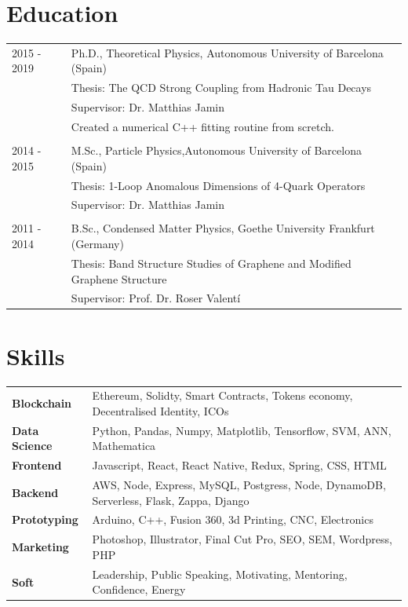 \documentclass[11pt]{article}
\begin{document}
\section*{Education}
\begin{tabularx}{\textwidth}{sX}
  2015 - 2019  & Ph.D., Theoretical Physics, Autonomous University of
                 Barcelona (Spain) \\
               & Thesis: The QCD Strong Coupling from Hadronic Tau
                 Decays \\
               & Supervisor: Dr. Matthias Jamin \\
               & Created a numerical C++ fitting routine from scretch. \\\\
  2014 - 2015  & M.Sc., Particle Physics,Autonomous University of
                                Barcelona (Spain) \\
               & Thesis: 1-Loop Anomalous Dimensions of 4-Quark
                 Operators \\
               & Supervisor: Dr. Matthias Jamin \\\\
  2011 - 2014  & B.Sc., Condensed Matter Physics, Goethe University Frankfurt (Germany) \\
               & Thesis: Band Structure Studies of Graphene and Modified
                 Graphene Structure \\
               & Supervisor: Prof. Dr. Roser Valentí
\end{tabularx}
		
\section*{Skills}
\begin{tabularx}{\textwidth}{lX}
  \textbf{Blockchain}   & Ethereum, Solidty, Smart Contracts, Tokens economy,
                          Decentralised Identity, ICOs \\
  \textbf{Data Science} & Python, Pandas, Numpy, Matplotlib, Tensorflow, SVM, ANN,
                          Mathematica \\
  \textbf{Frontend}     & Javascript, React, React Native, Redux, Spring, CSS, HTML  \\
  \textbf{Backend}      & AWS, Node, Express, MySQL, Postgress, Node, DynamoDB,
                          Serverless, Flask, Zappa, Django \\
  \textbf{Prototyping}  & Arduino, C++, Fusion 360, 3d Printing, CNC, Electronics \\
  \textbf{Marketing}    & Photoshop, Illustrator, Final Cut Pro, SEO, SEM, Wordpress, PHP \\
  \textbf{Soft}         & Leadership, Public Speaking, Motivating, Mentoring, Confidence, Energy
\end{tabularx}
\end{document}
